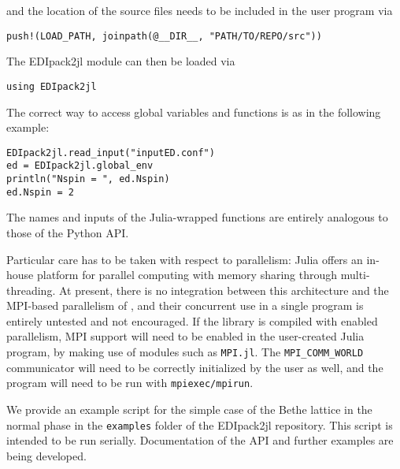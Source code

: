\documentclass[edipack_sp.tex]{subfiles}
\begin{document}
and the location of the source files needs to be included in the user program via
\begin{lstlisting}[style=myjulia]
push!(LOAD_PATH, joinpath(@__DIR__, "PATH/TO/REPO/src"))
\end{lstlisting}

The EDIpack2jl module can then be loaded via
\begin{lstlisting}[style=myjulia]
using EDIpack2jl
\end{lstlisting}

The correct way to access global variables and functions is as in the following example:
\begin{lstlisting}[style=myjulia]
EDIpack2jl.read_input("inputED.conf")
ed = EDIpack2jl.global_env
println("Nspin = ", ed.Nspin)
ed.Nspin = 2
\end{lstlisting}

The names and inputs of the Julia-wrapped functions are entirely analogous to those of the Python API.

Particular care has to be taken with respect to parallelism: Julia offers an in-house platform for parallel computing with memory sharing through multi-threading. At present, there is no integration between this architecture and the MPI-based parallelism of \NAME{}, and their concurrent use in a single program is entirely untested and not encouraged. If the \NAME{} library is compiled with enabled parallelism, MPI support will need to be enabled in the user-created Julia program, by making use of modules such as {\tt  MPI.jl}. The {\tt MPI\_COMM\_WORLD} communicator will need to be correctly initialized by the user as well, and the program will need to be run with {\tt  mpiexec/mpirun}.

We provide an example script for the simple case of the Bethe lattice in the normal phase in the {\tt  examples} folder of the EDIpack2jl repository. This script is intended to be run serially. Documentation of the API and further examples are being developed.




\ifSubfilesClassLoaded{
  
}{}
\end{document}
